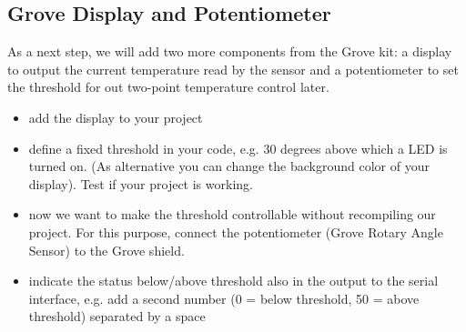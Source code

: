\subsection{Grove Display and Potentiometer}\label{sec:grovetemp}
As a next step, we will add two more components from the Grove kit: a display to output the current temperature read by the sensor and a potentiometer to set the threshold for out two-point temperature control later. 
\begin{itemize}
    \item add the display to your project
	\item define a fixed threshold in your code, e.g. 30 degrees above which a LED is turned on. (As alternative you can change the background color of your display). Test if your project is working.
	\item now we want to make the threshold controllable without recompiling our project. For this purpose, connect the potentiometer (Grove Rotary Angle Sensor) to the Grove shield.
 	\item indicate the status below/above threshold also in the output to the serial interface, e.g. add a second number (0 = below threshold, 50 = above threshold) separated by a space

\end{itemize}
